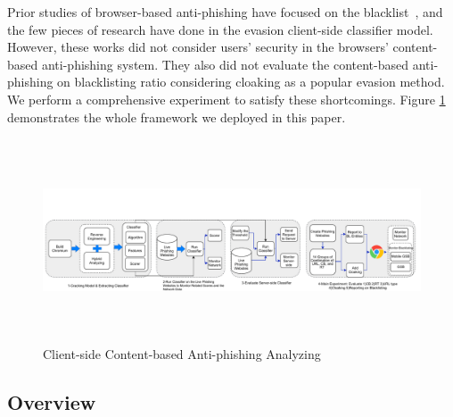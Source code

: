 \documentclass[letterpaper,twocolumn,10pt]{article}
\begin{document}
Prior studies of browser-based anti-phishing have focused on the blacklist~\cite{oest2019phishfarm,han2016phisheye,sheng2009empirical}, and the few pieces of research have done in the evasion client-side classifier model. However, these works did not consider users' security in the browsers' content-based anti-phishing system. They also did not evaluate the content-based anti-phishing on blacklisting ratio considering cloaking as a popular evasion method. We perform a comprehensive experiment to satisfy these shortcomings. Figure \ref{ frame work} demonstrates the whole framework we deployed in this paper.
\begin{figure}[h]
  \includegraphics[width=\textwidth,height=6cm]{Untitled Diagram (3).pdf}
  \caption{ Client-side Content-based Anti-phishing Analyzing}
  \label{ frame work}
\end{figure}

\subsection{Overview}




    
    


   
   
\end{document}

